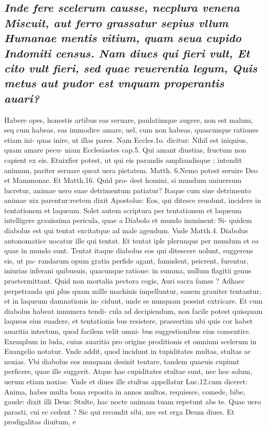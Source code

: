 \documentclass{article}
\begin{document}
\begin{pages}
\subsection*{\textit{Inde fere scelerum causse, necplura venena Miscuit, aut ferro grassatur sepius vllum Humanae mentis vitium, quam seua cupido Indomiti census. Nam diues qui fieri vult, Et cito vult fieri, sed quae reuerentia legum, Quis metus aut pudor est vnquam properantis auari? }}\pstart Habere opes, honestis artibus eas seruare, paulatimque augere, non est malum, seq cum habeas, eas immodice amare, uel, cum non habeas, quascunque rationes etiam ini- quas inire, ut illas pares. Nam Eccles.1o. dicitur: Nihil est iniquius, quam amare pecu- niam Ecclesiastes cap.5. Qui amant diustias, fructum non capient ex eis. Etuixfier potest, ut qui eis parandis ampliandisque ; intendit animum, pariter seruare queat uera pietatem. Matth. 6.Nemo potest seruire Deo et Mammonae. Et Matth.16. Quid pro- dest homini, si mundum uniuersum lucretur, animae uero suae detrimentum patiatur? Itaque cum sine detrimento animae uix parentur:rectem dixit Apostolus: Eos, qui ditesce reuolunt, incidere in tentationem et laqueum. Solet autem scriptura per tentationem et laqueum intelligere grauissima pericula, quae a Diabolo et mundo imminent: Si- quidem diabolus est qui tentat excitatque ad male agendum. Vnde Matth.4. Diabolus antonomatice uocatur ille qui tentat. Et tentat iple plerunque per mundum et ea quae in mundo sunt. Tentat itaque diabolus eos qui ditescere uolunt, suggerens eis, ut pa- randarum opum gratia perfide agant, famudent, peicrent, furentur, iniurias inferani quibusuis, quacunque ratione: in summa, nullum flagitii genus praetermittant. Quid non mortalia pectora cogis, Auri sacra fames ? Adhaec perpetranda qui plus quam mille machinis impelluntur, sanem grauiter tentantur, et in laqueum damnationis in- cidunt, unde se nunquam possint extricare. Et cum diabolus habeat innumera tendi- cula ad decipiendum, non facile potest quisquam laqueos eius euadere, et tentationis bus resistere, praesertim ubi quis cor habet auaritia intectum, quod facilem velit omni- bus suggestionibus eius consentire. Exemplum in luda, cuius auaritia pro origine proditionis et omnium scelerum in Euangelio notatur. Vnde addit, quod incidunt in tupiditates multas, stultas ac noxias. Vbi diabolus eos nunquam desinit tentare, tandem quaeuis cupiunt perficere, quae ille suggerit. Atque hae cupiditates stultae sunt, nec hoc solum, uerum etiam noxiae. Vnde et diues ille stultus appellatur Luc.12.cum diceret: Anima, habes multa bona reposita in annos multos, requiesce, comede, bibe, gaude:  dixit illi Deus: Stulte, hac nocte animam tuam repetunt abs te. Quae uero parasti, cui ec cedent ? Sic qui recondit sibi, nec est erga Deum diues. Et prodigalitas diuitum, e  \pend

\end{pages}
\end{document}
